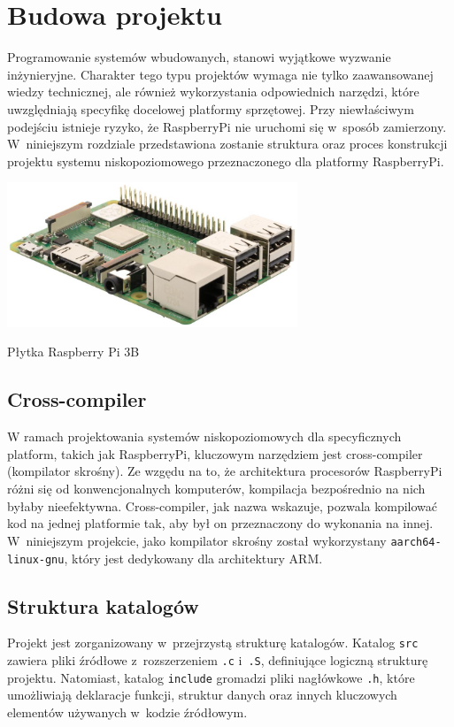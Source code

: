 \documentclass[shortabstract]{iithesis}
\begin{document}
\section{Budowa projektu}
Programowanie systemów wbudowanych, stanowi wyjątkowe wyzwanie inżynieryjne. Charakter tego typu projektów wymaga nie tylko zaawansowanej wiedzy technicznej, ale również wykorzystania odpowiednich narzędzi, które uwzględniają specyfikę docelowej platformy sprzętowej. Przy niewłaściwym podejściu istnieje ryzyko, że RaspberryPi nie uruchomi się w~sposób zamierzony. W~niniejszym rozdziale przedstawiona zostanie struktura oraz proces konstrukcji projektu systemu niskopoziomowego przeznaczonego dla platformy RaspberryPi.

\begingroup
\centering
\includegraphics[width=0.65\textwidth]{rpi3b.jpg}
\captionsetup{type=figure}
\caption{Płytka Raspberry Pi 3B}
\endgroup
\subsection{Cross-compiler}
W ramach projektowania systemów niskopoziomowych dla specyficznych platform, takich jak RaspberryPi, kluczowym narzędziem jest cross-compiler (kompilator skrośny). Ze wzgędu na to, że architektura procesorów RaspberryPi różni się od konwencjonalnych komputerów, kompilacja bezpośrednio na nich byłaby nieefektywna. Cross-compiler, jak nazwa wskazuje, pozwala kompilować kod na jednej platformie tak, aby był on przeznaczony do wykonania na innej. W~niniejszym projekcie, jako kompilator skrośny został wykorzystany \texttt{aarch64-linux-gnu}, który jest dedykowany dla architektury ARM.
\subsection{Struktura katalogów}
Projekt jest zorganizowany w~przejrzystą strukturę katalogów. Katalog \texttt{src} zawiera pliki źródłowe z~rozszerzeniem \texttt{.c} i~\texttt{.S}, definiujące logiczną strukturę projektu. Natomiast, katalog \texttt{include} gromadzi pliki nagłówkowe \texttt{.h}, które umożliwiają deklaracje funkcji, struktur danych oraz innych kluczowych elementów używanych w~kodzie źródłowym.
\end{document}
